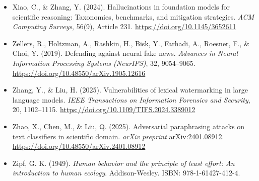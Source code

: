 \begin{itemize}[leftmargin=1.5em, label={}, itemsep=0.22ex, parsep=0pt]
    \item Xiao, C., \& Zhang, Y. (2024). Hallucinations in foundation models for scientific reasoning: Taxonomies, benchmarks, and mitigation strategies. \textit{ACM Computing Surveys}, 56(9), Article 231. \url{https://doi.org/10.1145/3652611}
    \item Zellers, R., Holtzman, A., Rashkin, H., Bisk, Y., Farhadi, A., Roesner, F., \& Choi, Y. (2019). Defending against neural fake news. \textit{Advances in Neural Information Processing Systems (NeurIPS)}, 32, 9054--9065. \url{https://doi.org/10.48550/arXiv.1905.12616}
    \item Zhang, Y., \& Liu, H. (2025). Vulnerabilities of lexical watermarking in large language models. \textit{IEEE Transactions on Information Forensics and Security}, 20, 1102--1115. \url{https://doi.org/10.1109/TIFS.2024.3389012}
    \item Zhao, X., Chen, M., \& Liu, Q. (2025). Adversarial paraphrasing attacks on text classifiers in scientific domain. \textit{arXiv preprint} arXiv:2401.08912. \url{https://doi.org/10.48550/arXiv.2401.08912}
    \item Zipf, G. K. (1949). \textit{Human behavior and the principle of least effort: An introduction to human ecology}. Addison-Wesley. ISBN: 978-1-61427-412-4.
\end{itemize}
